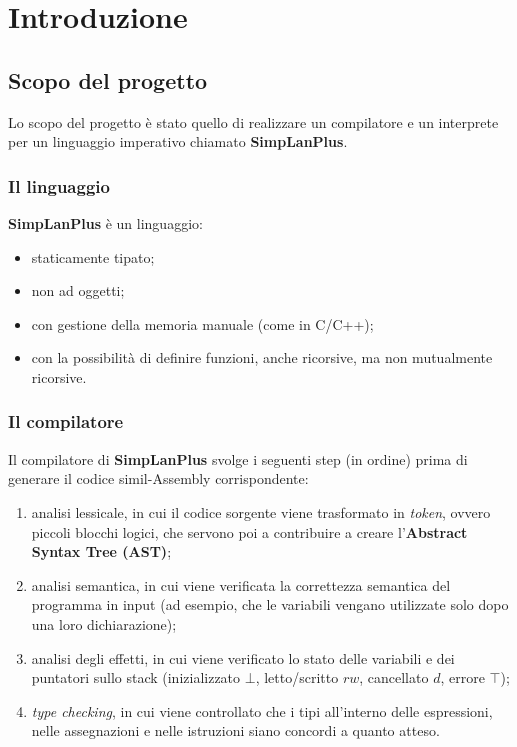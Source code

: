 \documentclass[../report.tex]{subfiles}
\begin{document}
\chapter{Introduzione}\label{c:introduzione}
\section{Scopo del progetto}\label{s:scopo-progetto}
Lo scopo del progetto è stato quello di realizzare un compilatore e un interprete per un linguaggio imperativo chiamato \textbf{SimpLanPlus}.

\subsection{Il linguaggio}\label{ss:linguaggio}
\textbf{SimpLanPlus} è un linguaggio:
\begin{itemize}
    \item staticamente tipato;
    \item non ad oggetti;
    \item con gestione della memoria manuale (come in C/C++);
    \item con la possibilità di definire funzioni, anche ricorsive, ma non mutualmente ricorsive.
\end{itemize}

\subsection{Il compilatore}\label{ss:compilatore}
Il compilatore di \textbf{SimpLanPlus} svolge i seguenti step (in ordine) prima di generare il codice simil-Assembly corrispondente:
\begin{enumerate}
    \item analisi lessicale, in cui il codice sorgente viene trasformato in \textit{token}, ovvero piccoli blocchi logici, che servono poi a contribuire a creare l'\textbf{Abstract Syntax Tree (AST)};
    \item analisi semantica, in cui viene verificata la correttezza semantica del programma in input (ad esempio, che le variabili vengano utilizzate solo dopo una loro dichiarazione);
    \item analisi degli effetti, in cui viene verificato lo stato delle variabili e dei puntatori sullo stack (inizializzato $\bot$, letto/scritto $rw$, cancellato $d$, errore $\top$);
    \item \textit{type checking}, in cui viene controllato che i tipi all'interno delle espressioni, nelle assegnazioni e nelle istruzioni siano concordi a quanto atteso.
\end{enumerate}
\end{document}
